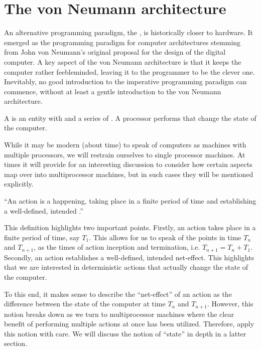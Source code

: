 \section{The von Neumann architecture}

An alternative programming paradigm, the , is historically
closer to hardware. It emerged as the programming paradigm for computer
architectures stemming from John von Neumann's original proposal for the design
of the digital computer\cite{von-neumann}.  A key aspect of the von Neumann
architecture is that it keeps the computer rather feebleminded, leaving it to
the programmer to be the clever one. Inevitably, no good introduction to the
imperative programming paradigm can commence, without at least a gentle
introduction to the von Neumann architecture.

\begin{definition}

A \footnotemark is an entity with  and a series of
.  A processor performs  that change the state of
the computer.


\end{definition}

While it may be modern (about time) to speak of computers as machines with
multiple processors, we will restrain ourselves to single processor machines.
At times it will provide for an interesting discussion to consider how certain
aspects map over into multiprocessor machines, but in such cases they will be
mentioned explicitly.

\begin{definition}

``An action is a happening, taking place in a finite period of time and
establishing a well-defined, intended .''
\cite{dijkstra-introduction}

\end{definition}

This definition highlights two important points. Firstly, an action takes place
in a finite period of time, say $T_1$. This allows for us to speak of the
points in time $T_n$ and $T_{n+1}$, as the times of action inception and
termination, i.e. $T_{n+1}=T_n+T_1$. Secondly, an action establishes a
well-defined, intended net-effect. This highlights that we are interested in
deterministic actions that actually change the state of the computer.

To this end, it makes sense to describe the ``net-effect'' of an action as the
difference between the state of the computer at time $T_n$ and $T_{n+1}$.
However, this notion breaks down as we turn to multiprocessor machines where
the clear benefit of performing multiple actions at once has been utilized.
Therefore, apply this notion with care. We will discuss the notion of ``state''
in depth in a latter section.

